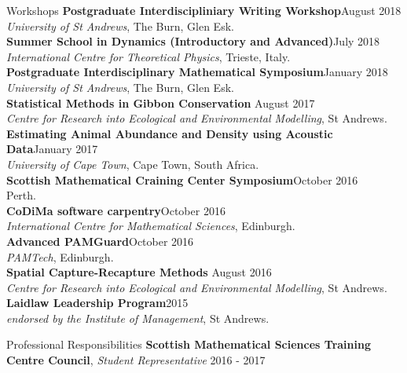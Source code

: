 \documentclass{resume} %
\begin{document}
\begin{rSection}{Workshops} \itemsep -3pt  
{\textbf{Postgraduate Interdiscipliniary Writing Workshop}}\hfill August 2018\\ \emph{University of St Andrews}, The Burn, Glen Esk.  \\ 
{\textbf{Summer School in Dynamics (Introductory and Advanced)}}\hfill July 2018\\ \emph{International Centre for Theoretical Physics}, Trieste, Italy.  \\ 
{\textbf{Postgraduate Interdisciplinary Mathematical Symposium}}\hfill January 2018\\ \emph{University of St Andrews}, The Burn, Glen Esk.  \\ 
{\textbf{Statistical Methods in Gibbon Conservation}} \hfill August 2017\\ \emph{Centre for Research into Ecological and Environmental Modelling}, {St Andrews.} \\ 
{\textbf{Estimating Animal Abundance and Density using Acoustic Data}}\hfill January 2017\\ \emph{University of Cape Town}, Cape Town, South Africa.  \\ 
{\textbf{Scottish Mathematical Craining Center Symposium}\hfill October 2016\\  {Perth.}} \\
{\textbf{CoDiMa software carpentry}}\hfill October 2016 \\ \emph{International Centre for Mathematical Sciences}, Edinburgh. \\
{\textbf{Advanced PAMGuard}}\hfill October 2016\\ \emph{PAMTech}, {Edinburgh.}  \\
{\textbf{Spatial Capture-Recapture Methods} \hfill August 2016\\ \emph{Centre for Research into Ecological and Environmental Modelling}, {St Andrews.}} \\
\textbf{Laidlaw Leadership Program}\hfill 2015\\ \emph{endorsed by the Institute of Management}, St Andrews.
\end{rSection}  


\begin{rSection}{Professional Responsibilities}
\textbf{Scottish Mathematical Sciences Training Centre Council}, \emph{Student Representative} \hfill 2016 - 2017\\
\end{rSection}
\end{document}
